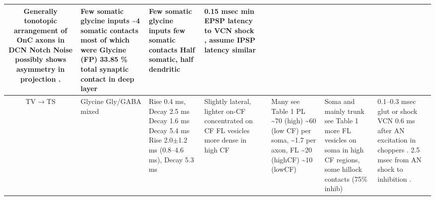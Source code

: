 \begin{longtable}{cYYYYYYY}
Generally tonotopic arrangement of OnC axons in DCN \citep{ArnottWallaceEtAl:2004}
Notch Noise possibly shows asymmetry in projection \citep{ReissYoung:2005}.      
                                & 
Few somatic glycine inputs 
\citep{OsenOttersenEtAl:1990,OstapoffMorestEtAl1999:1999,ZhangOertel:1993}
\~{}4 somatic contacts most of which were Glycine (FP) \citep{Alibardi:1999}
33.85 \% total synaptic contact in deep layer \citep[rat][]{RubioJuiz:2004}
                                & 
Few somatic glycine inputs \citep{OsenOttersenEtAl:1990,OstapoffMorestEtAl:1999,ZhangOertel:1993} 
few  somatic contacts \citep{Alibardi:1999}                   
Half somatic, half dendritic \citep[rat][]{RubioJuiz:2004}
                                & 
0.15 msec min EPSP latency to VCN shock , assume IPSP latency similar
\citep{ZhangOertel:1993}\\ \midrule
TV\ensuremath{\rightarrow}TS                        
                                & %
Glycine \citep{OertelWickesberg:1993,OstapoffMorestEtAl:1999,SaintBensonEtAl:1991,WickesbergOertel:1993}
Gly\slash GABA mixed \citep[Cat,][]{OsenOttersenEtAl:1990}                  
                                & %
Rise 0.4 ms, Decay 2.5 ms \citep[spontaneous IPSCs in rat MNTB neurons,][]{AwatramaniTurecekEtAl:2005}
Decay 1.6 ms \citep[mouse VCN,]{Oertel:1983}
Decay 5.4 ms \citep{OertelWickesberg:1993,WickesbergOertel:1993}    
Rise 2.0$\pm$1.2 ms (0.8--4.6 ms), Decay 5.3 ms \citep[Gly puffs at 22$^\circ$C (Q$_{10}$ 2.1) in  guinea pig VCN,][]{HartyManis:1998}
                                & %
Slightly lateral, lighter on-CF \citep{OstapoffMorestEtAl:1999} 
concentrated on CF \citep{ZhangOertel:1993} 
FL vesicles more dense in high CF \citep{JosephsonMorest:1998}                        
                                & %
                                & %
Many \citep{OstapoffMorestEtAl:1999} see
Table 1 \citep{SmithRhode:1989} 
PL \~{}70 (high) \~{}60 (low CF) per soma,
\~{}1.7 per axon, 
FL \~{}20 (highCF) \~{}10 (lowCF)  \citep{JosephsonMorest:1998}                        
                                & %
Soma and mainly trunk \citep{AltschulerJuizEtAl:1993} 
see Table 1 \citep{SmithRhode:1989} 
more FL vesicles on soma in high CF regions, some hillock contacts (75\% inhib) \citep{JosephsonMorest:1998}
                                & %
0.1--0.3 msec glut or shock VCN \citep{ZhangOertel:1993}
0.6 ms after AN excitation in choppers \citep{Wickesberg:1996}. 
2.5 msec from AN shock to inhibition \citep{WickesbergOertel:1993}. 
\\ \midrule

\end{longtable}
